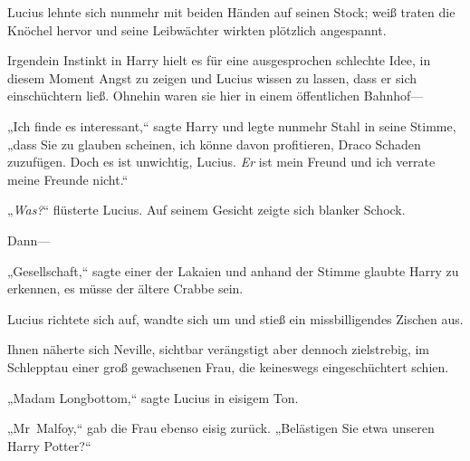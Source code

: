 Lucius lehnte sich nunmehr mit beiden Händen auf seinen Stock; weiß traten die Knöchel hervor und seine Leibwächter wirkten plötzlich angespannt.

Irgendein Instinkt in Harry hielt es für eine ausgesprochen schlechte Idee, in diesem Moment Angst zu zeigen und Lucius wissen zu lassen, dass er sich einschüchtern ließ. Ohnehin waren sie hier in einem öffentlichen Bahnhof—

„Ich finde es interessant,“ sagte Harry und legte nunmehr Stahl in seine Stimme, „dass Sie zu glauben scheinen, ich könne davon profitieren, Draco Schaden zuzufügen. Doch es ist unwichtig, Lucius. \emph{Er} ist mein Freund und ich verrate meine Freunde nicht.“

„\emph{Was?}“ flüsterte Lucius. Auf seinem Gesicht zeigte sich blanker Schock.

Dann—

„Gesellschaft,“ sagte einer der Lakaien und anhand der Stimme glaubte Harry zu erkennen, es müsse der ältere Crabbe sein.

Lucius richtete sich auf, wandte sich um und stieß ein missbilligendes Zischen aus.

Ihnen näherte sich Neville, sichtbar verängstigt aber dennoch zielstrebig, im Schlepptau einer groß gewachsenen Frau, die keineswegs eingeschüchtert schien.

„Madam Longbottom,“ sagte Lucius in eisigem Ton.

„Mr~Malfoy,“ gab die Frau ebenso eisig zurück. „Belästigen Sie etwa unseren Harry Potter?“

